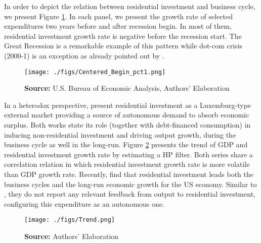 \documentclass[12pt, a4paper]{article}
\begin{document}
In order to depict the relation between residential investment and business cycle, we present Figure \ref{fig:cycle}.
In each panel, we present the growth rate of selected expenditures two years before and after recession begin.
In most of them, residential investment growth rate is negative before the recession start.
The Great Recession is a remarkable example of this pattern while dot-com crisis (2000-1) is an exception as already pointed out by \textcite{leamer_housing_2007}.


\begin{figure}[H]
	\centering
	\caption{Selected expecditure growth rates 2 years before and after recession start\\Dashed lines indicates recession start (NBER recession dating procedure)}
	\label{fig:cycle}
	\texttt{[image: ./figs/Centered\_Begin\_pct1.png]}
	\caption*{\textbf{Source:} U.S. Bureau of Economic Analysis, Authors' Elaboration}
\end{figure}


In a heterodox perspective, \textcites{fiebiger_semi-autonomous_2018}{fiebiger_trend_2017} present residential investment as a Luxemburg-type external market providing a source of autonomous demand to absorb economic surplus.
Both works state its role (together with debt-financed consumption) in inducing non-residential investment and driving output growth, during the business cycle as well in the long-run.
Figure \ref{fig:trend} presents the trend of GDP and residential investment growth rate by estimating a HP filter.
Both series share a correlation relation in which residential investment growth rate is more volatile than GDP growth rate.
Recently, \textcite{perez_Montiel_2021} find that residential investment leads both the business cycles and the long-run economic growth for the US economy.
Similar to \textcite{girardi_long-run_2016}, they do not report any relevant feedback from output to residential investment, configuring this expenditure as an autonomous one.

\begin{figure}[H]
	\centering
	\caption{GDP and Residential investment growth rate tred (HP filter, $\lambda = 1600$)}
	\label{fig:trend}
	\texttt{[image: ./figs/Trend.png]}
	\caption*{\textbf{Source:} Authors' Elaboration}
\end{figure}
\end{document}
